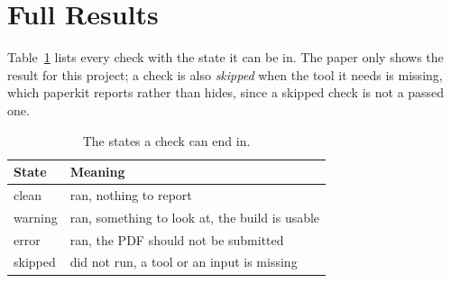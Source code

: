 \section{Full Results}

Table~\ref{tab:full} lists every check with the state it can be in. The paper
only shows the result for this project; a check is also \emph{skipped} when
the tool it needs is missing, which paperkit reports rather than hides, since
a skipped check is not a passed one.

\begin{table}[h]
  \caption{The states a check can end in.}
  \label{tab:full}
  \begin{tabular}{ll}
    \toprule
    State & Meaning \\
    \midrule
    clean & ran, nothing to report \\
    warning & ran, something to look at, the build is usable \\
    error & ran, the PDF should not be submitted \\
    skipped & did not run, a tool or an input is missing \\
    \bottomrule
  \end{tabular}
\end{table}
